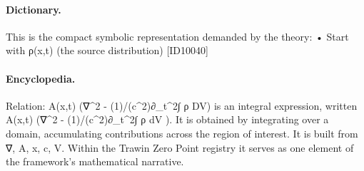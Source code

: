 \paragraph{Dictionary.}
This is the compact symbolic representation demanded by the theory: • Start with ρ(x,t) (the source distribution) [ID10040]

\paragraph{Encyclopedia.}
Relation: A(x,t) (∇\textasciicircum{}2 - (1)/(c\textasciicircum{}2)∂\_t\textasciicircum{}2∫ ρ DV) is an integral expression, written A(x,t) (∇\textasciicircum{}2 - (1)/(c\textasciicircum{}2)∂\_t\textasciicircum{}2∫ ρ dV ). It is obtained by integrating over a domain, accumulating contributions across the region of interest. It is built from ∇, A, x, c, V. Within the Trawin Zero Point registry it serves as one element of the framework's mathematical narrative.
